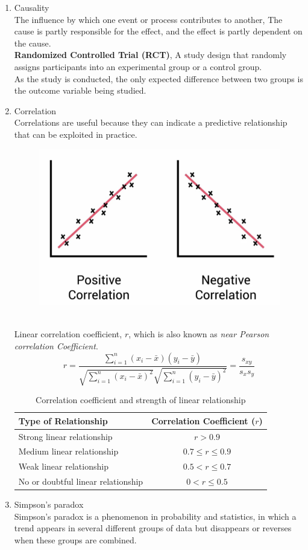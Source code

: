 \documentclass{article}
\begin{document}
\begin{enumerate}
    \item Causality \\ 
    The influence by which one event or process contributes to another, The cause is partly responsible for the effect, and the effect is partly dependent on the cause.\\
    \textbf{Randomized Controlled Trial (RCT)}, A study design that randomly assigns participants into an experimental group or a control group.\\
    As the study is conducted, the only expected difference between two groups is the outcome variable being studied.
    \item Correlation \\
    Correlations are useful because they can indicate a predictive relationship that can be exploited in practice.
    \begin{figure}[h]
        \centering
        \includegraphics[width=0.75\linewidth]{image/correlation.png}
    \end{figure} \\
    Linear correlation coefficient, $r$, which is also known as \textit{near Pearson correlation Coefficient}. 
    \[r = \frac{\sum_{i=1}^{n} (x_i - \bar{x})(y_i - \bar{y})}
    {\sqrt{\sum_{i=1}^{n} (x_i - \bar{x})^2} \sqrt{\sum_{i=1}^{n} (y_i - \bar{y})^2}}
    = \frac{s_{xy}}{s_x s_y}\]
    \begin{table}[h]
        \centering
        \begin{tabular}{lc}
        \hline
        \textbf{Type of Relationship} & \textbf{Correlation Coefficient (\( r \))} \\
        \hline
        Strong linear relationship & \( r > 0.9 \) \\
        Medium linear relationship & \( 0.7 \leq r \leq 0.9 \) \\
        Weak linear relationship & \( 0.5 < r \leq 0.7 \) \\
        No or doubtful linear relationship & \( 0 < r \leq 0.5 \) \\
        \hline
        \end{tabular}
        \caption{Correlation coefficient and strength of linear relationship}
    \end{table}
    \item Simpson's paradox \\
    Simpson's paradox is a phenomenon in probability and statistics, in which a trend appears in several different groups of data but disappears or reverses when these groups are combined.
\end{enumerate}
\end{document}

